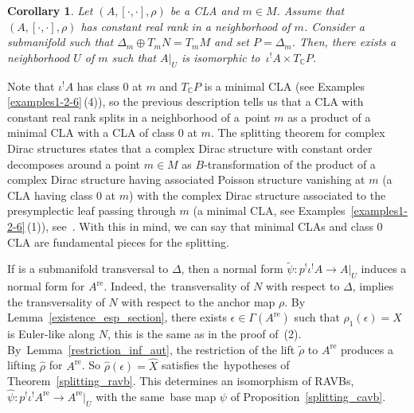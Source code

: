 \documentclass[pdftex]{sigma}
\numberwithin{equation}{section}
\newtheorem{Corollary}[Theorem]{Corollary}
\newcommand{\C}{{\mathbb{C}}}
\DeclareMathOperator{\real}{re}
\begin{document}
\begin{Corollary}\label{loc_splitting_CLA}
Let $(A,[\cdot,\cdot],\rho)$ be a CLA and $m\in M$. Assume that $(A,[\cdot,\cdot],\rho)$ has constant real rank in a neighborhood of $m$. Consider a submanifold  such that $\Delta_{m}\oplus T_m N=T_m M$ and set $P=\Delta_{m}$. Then, there exists a neighborhood $U$ of $m$ such that $A|_{U}$ is isomorphic to~${\iota^! A\times T_{\C}P}$.
\end{Corollary}

Note that $\iota^! A$ has class $0$ at $m$ and $T_{\C}P$ is a minimal CLA (see Examples \ref{examples1-2-6}\,(4)), so the previous description tells us that a CLA with constant real rank splits in a neighborhood of a~point $m$ as a product of a minimal CLA with a CLA of class $0$ at $m$.
The splitting theorem for complex Dirac structures states that a complex Dirac structure with constant order decomposes around a point $m\in M$ as $B$-transformation of the product of a complex Dirac structure having associated Poisson structure vanishing at $m$ (a CLA having class $0$ at $m$) with the complex Dirac structure associated to the presymplectic leaf passing through $m$ (a minimal CLA, see Examples~\ref{examples1-2-6}\,(1)), see~\cite{aguero2022complex}. With this in mind, we can say that minimal CLAs and class $0$ CLA are fundamental pieces for the splitting.

\begin{Remark}
  If  is a submanifold transversal to $\Delta$, then a normal form $\widetilde{\psi}\colon p^{!}\iota^{!}A\to A|_U$ induces a normal form for $A^{\real}$. Indeed, the~transversality of $N$ with respect to $\Delta$, implies the transversality of $N$ with respect to the anchor map $\rho$. By Lemma~\ref{existence_esp_section}, there exists ${\epsilon\in \Gamma(A^{\real})}$ such that $\rho_1(\epsilon)=X$ is Euler-like along $N$, this is the same as in the proof of~(2). By~Lemma~\ref{restriction_inf_aut}, the restriction of the lift $\widetilde{\rho}$ to $A^{\real}$ produces a lifting $\widehat{\rho}$ for $A^{\real}$. So $\widehat{\rho}(\epsilon)=\widehat{X}$ satisfies the~hypotheses of Theorem~\ref{splitting_ravb}. This determines an isomorphism of RAVBs, $\widehat{\psi}\colon p^!\iota^! A^{\real}\to A^{\real}|_U$ with the same~base map $\psi$ of Proposition~\ref{splitting_cavb}.
\end{Remark}
\end{document}
